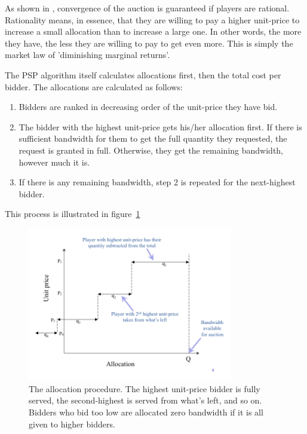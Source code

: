 As shown in \cite{PSP}, convergence of the auction is guaranteed if players are rational. Rationality means, in essence, that they are willing to pay a higher unit-price to increase a small allocation than to increase a large one. In other words, the more they have, the less they are willing to pay to get even more. This is simply the market law of 'diminishing marginal returns'.

The PSP algorithm itself calculates allocations first, then the total cost per bidder. The allocations are calculated as follows:

\begin{enumerate}
\item[1)] Bidders are ranked in decreasing order of the unit-price they have bid.
\item[2)] The bidder with the highest unit-price gets his/her allocation first. If there is sufficient bandwidth for them to get the full quantity they requested, the request is granted in full. Otherwise, they get the remaining bandwidth, however much it is.
\item[3)] If there is any remaining bandwidth, step 2 is repeated for the next-highest bidder.
\end{enumerate}

This process is illustrated in figure~\ref{fig:allocation}

\begin{figure}[h]
 \centering
   \includegraphics[width=0.8\textwidth]{allocation}
       \caption{The allocation procedure. The highest unit-price bidder is fully served, the second-highest is served from what's left, and so on. Bidders who bid too low are allocated zero bandwidth if it is all given to higher bidders.}
 \label{fig:allocation}
\end{figure}

